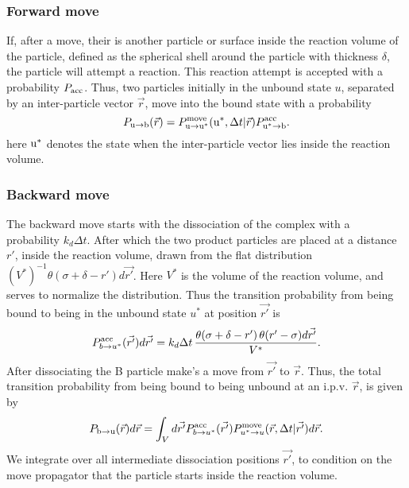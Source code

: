 \subsubsection{Forward move}
If, after a move, their is another particle or surface inside the reaction volume of the particle, defined as the spherical shell around the particle with thickness $\delta$, the particle will attempt a reaction. This reaction attempt is accepted with a probability $P_{\rm acc}$. Thus, two particles initially in the unbound state $u$, separated by an inter-particle vector $\vec{r}$, move into the bound state with a probability
\begin{equation}
P_{ \rm{u} \rightarrow \rm{b} }(\vec{r}) = P^{\rm move}_{{\rm u} \rightarrow {\rm u}^*}({\rm u}^*,\Delta t|\vec{r}) P^{\rm acc}_{{\rm u}^* \rightarrow {\rm b}}.
\end{equation}
here ${\rm u}^*$ denotes the state when the inter-particle vector lies inside the reaction volume. 

\subsubsection{Backward move}
The backward move starts with the dissociation of the complex with a probability $k_d \Delta t$. After which the two product particles are placed at a distance $r'$, inside the reaction volume, drawn from the flat distribution $(V^*)^{-1} \theta(\sigma + \delta - r')d\vec{r'}$. Here $V^*$ is the volume of the reaction volume, and serves to normalize the distribution. Thus the transition probability from being bound to being in the unbound state $u^*$ at position $\vec{r'}$ is
\begin{equation}
 P^{\rm acc}_{b \rightarrow u^*}(\vec{r'})d\vec{r'} = k_d \Delta t \, \frac{\theta(\sigma + \delta - r') \, \theta(r' - \sigma) d\vec{r'}}{V^*}.
\end{equation}
After dissociating the B particle make's a move from $\vec{r'}$ to $\vec{r}$. Thus, the total transition probability from being bound to being unbound at an i.p.v. $\vec{r}$, is given by
\begin{equation}
P_{ \rm{b} \rightarrow \rm{u}}(\vec{r})d\vec{r} =  \int_{V} d\vec{r'} P^{\rm acc}_{b \rightarrow u^*}(\vec{r'}) P^{\rm move}_{u^* \rightarrow u}(\vec{r},\Delta t|\vec{r'})d\vec{r}.
\end{equation}
We integrate over all intermediate dissociation positions $\vec{r'}$, to condition on the move propagator that the particle starts inside the reaction volume.


